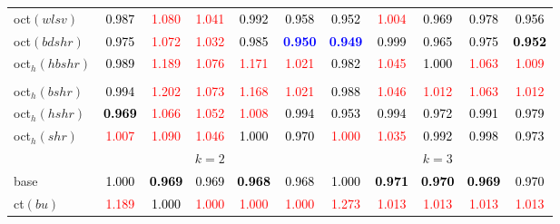 \begin{tabular}[t]{l|>{}cccc>{}c|ccccc}
oct$(wlsv)$ & \textcolor{black}{0.987} & \textcolor{red}{1.080} & \textcolor{red}{1.041} & \textcolor{black}{0.992} & \textcolor{black}{0.958} & \textcolor{black}{0.952} & \textcolor{red}{1.004} & \textcolor{black}{0.969} & \textcolor{black}{0.978} & \textcolor{black}{0.956}\\
oct$(bdshr)$ & \textcolor{black}{0.975} & \textcolor{red}{1.072} & \textcolor{red}{1.032} & \textcolor{black}{0.985} & \textcolor{blue}{\textbf{0.950}} & \textcolor{blue}{\textbf{0.949}} & \textcolor{black}{0.999} & \textcolor{black}{0.965} & \textcolor{black}{0.975} & \textcolor{black}{\textbf{0.952}}\\
oct$_h(hbshr)$ & \textcolor{black}{0.989} & \textcolor{red}{1.189} & \textcolor{red}{1.076} & \textcolor{red}{1.171} & \textcolor{red}{1.021} & \textcolor{black}{0.982} & \textcolor{red}{1.045} & \textcolor{black}{1.000} & \textcolor{red}{1.063} & \textcolor{red}{1.009}\\[-1.5ex]
\hline\\[-1.5ex]
oct$_h(bshr)$ & \textcolor{black}{0.994} & \textcolor{red}{1.202} & \textcolor{red}{1.073} & \textcolor{red}{1.168} & \textcolor{red}{1.021} & \textcolor{black}{0.988} & \textcolor{red}{1.046} & \textcolor{red}{1.012} & \textcolor{red}{1.063} & \textcolor{red}{1.012}\\
oct$_h(hshr)$ & \textcolor{black}{\textbf{0.969}} & \textcolor{red}{1.066} & \textcolor{red}{1.052} & \textcolor{red}{1.008} & \textcolor{black}{0.994} & \textcolor{black}{0.953} & \textcolor{black}{0.994} & \textcolor{black}{0.972} & \textcolor{black}{0.991} & \textcolor{black}{0.979}\\
oct$_h(shr)$ & \textcolor{red}{1.007} & \textcolor{red}{1.090} & \textcolor{red}{1.046} & \textcolor{black}{1.000} & \textcolor{black}{0.970} & \textcolor{red}{1.000} & \textcolor{red}{1.035} & \textcolor{black}{0.992} & \textcolor{black}{0.998} & \textcolor{black}{0.973}\\
\addlinespace[0.3em]
\multicolumn{1}{c}{} & \multicolumn{5}{c}{\textbf{$k = 2$}} & \multicolumn{5}{c}{\textbf{$k = 3$}}\\
base & \textcolor{black}{1.000} & \textcolor{black}{\textbf{0.969}} & \textcolor{black}{0.969} & \textcolor{black}{\textbf{0.968}} & \textcolor{black}{0.968} & \textcolor{black}{1.000} & \textcolor{black}{\textbf{0.971}} & \textcolor{black}{\textbf{0.970}} & \textcolor{black}{\textbf{0.969}} & \textcolor{black}{0.970}\\
ct$(bu)$ & \textcolor{red}{1.189} & \textcolor{black}{1.000} & \textcolor{red}{1.000} & \textcolor{red}{1.000} & \textcolor{red}{1.000} & \textcolor{red}{1.273} & \textcolor{red}{1.013} & \textcolor{red}{1.013} & \textcolor{red}{1.013} & \textcolor{red}{1.013}\\

\end{tabular}
